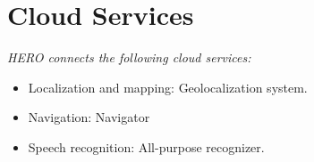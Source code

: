 \section*{Cloud Services}

\textit{HERO connects the following cloud services:}
\begin{itemize}
	\item Localization and mapping: Geolocalization system.
	\item Navigation: Navigator
	\item Speech recognition: All-purpose recognizer.
\end{itemize} 